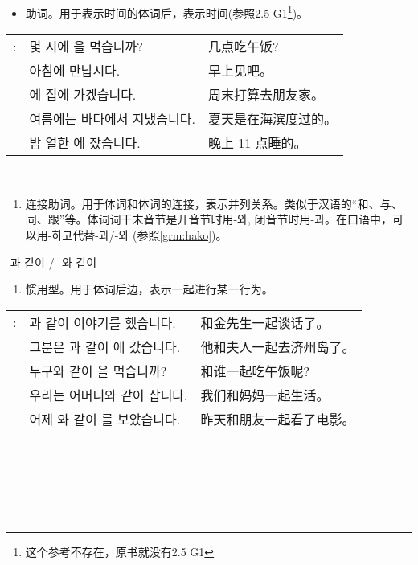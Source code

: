 \begin{grammar}
	\begin{grammarsect}[-에]
		\begin{itemize}
			\item 助词。用于表示时间的体词后，表示时间(参照2.5 G1\footnote{这个参考不存在，原书就没有2.5 G1})。\\
		\end{itemize}
		\begin{tabular}{lll}
			\ruby{例}{예}: & 몇 시에 \ruby{點心}{점심}을 먹습니까?              & 几点吃午饭?     \\
			             & 아침에 만납시다.                              & 早上见吧。      \\
			             & \ruby{週末}{주말}에 \ruby{親舊}{친구} 집에 가겠습니다. & 周末打算去朋友家。  \\
			             & 여름에는 바다에서 지냈습니다.                       & 夏天是在海滨度过的。 \\
			             & 밤 열한 \ruby{時}{시}에 잤습니다.                & 晚上 11 点睡的。
		\end{tabular}\\
	\end{grammarsect}
	\begin{grammarsect}[-과 / -와]\label{grm:ua}
		\begin{enumerate}
			\item 连接助词。用于体词和体词的连接，表示并列关系。类似于汉语的“和、与、同、跟”等。体词词干末音节是开音节时用-와, 闭音节时用-과。在口语中，可以用-하고代替-과/-와 (参照\ref{grm:hako})。
		\end{enumerate}
		{\large \HandRight -과 같이 / -와 같이\\}
		\begin{enumerate}
			\item 惯用型。用于体词后边，表示一起进行某一行为。\\
		\end{enumerate}
		\begin{tabular}{lll}
			\ruby{例}{예}: &\ruby{金}{김} \ruby{先生}{선생}과 같이 이야기를 했습니다. &和金先生一起谈话了。\\
			&그분은 \ruby{夫人}{부인}과 같이 \ruby{濟州島}{제주도}에 갔습니다. &他和夫人一起去济州岛了。 \\
			&누구와 같이 \ruby{點心}{점심}을 먹습니까?&和谁一起吃午饭呢? \\
			&우리는 어머니와 같이 삽니다.&我们和妈妈一起生活。\\
			&어제 \ruby{親舊}{친구}와 같이 \ruby{映畫}{영화}를 보았습니다.&昨天和朋友一起看了电影。\\
	\end{tabular}\\
	\end{grammarsect}
\end{grammar}
\section{\kr {} }
{\kr 
\begin{dic}
	\begin{dicsect}
		\begin{tabular}{lll}
			
		\end{tabular}\\
	\end{dicsect}
\end{dic}

}